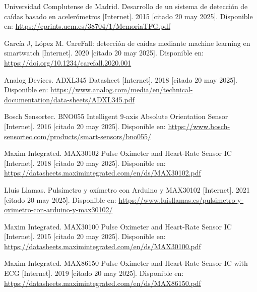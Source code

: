 \documentclass[12pt, a4paper]{article}
\begin{document}
\begin{thebibliography}{9}
	Universidad Complutense de Madrid. Desarrollo de un sistema de detección de caídas basado en acelerómetros [Internet]. 2015 [citado 20 may 2025]. Disponible en: \url{https://eprints.ucm.es/38704/1/MemoriaTFG.pdf}
	
	García J, López M. CareFall: detección de caídas mediante machine learning en smartwatch [Internet]. 2020 [citado 20 may 2025]. Disponible en: \url{https://doi.org/10.1234/carefall.2020.001}
	
	Analog Devices. ADXL345 Datasheet [Internet]. 2018 [citado 20 may 2025]. Disponible en: \url{https://www.analog.com/media/en/technical-documentation/data-sheets/ADXL345.pdf}
	
	Bosch Sensortec. BNO055 Intelligent 9-axis Absolute Orientation Sensor [Internet]. 2016 [citado 20 may 2025]. Disponible en: \url{https://www.bosch-sensortec.com/products/smart-sensors/bno055/}
	
	Maxim Integrated. MAX30102 Pulse Oximeter and Heart-Rate Sensor IC [Internet]. 2018 [citado 20 may 2025]. Disponible en: \url{https://datasheets.maximintegrated.com/en/ds/MAX30102.pdf}
	
	Lluís Llamas. Pulsímetro y oxímetro con Arduino y MAX30102 [Internet]. 2021 [citado 20 may 2025]. Disponible en: \url{https://www.luisllamas.es/pulsimetro-y-oximetro-con-arduino-y-max30102/}
	
	Maxim Integrated. MAX30100 Pulse Oximeter and Heart-Rate Sensor IC [Internet]. 2015 [citado 20 may 2025]. Disponible en: \url{https://datasheets.maximintegrated.com/en/ds/MAX30100.pdf}
	
	Maxim Integrated. MAX86150 Pulse Oximeter and Heart-Rate Sensor IC with ECG [Internet]. 2019 [citado 20 may 2025]. Disponible en: \url{https://datasheets.maximintegrated.com/en/ds/MAX86150.pdf}
	


	
\end{thebibliography}
\end{document}
